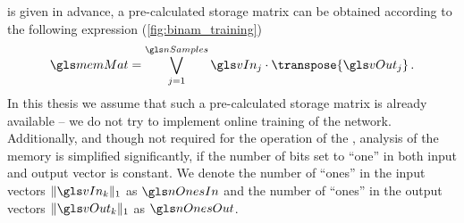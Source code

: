 is given in advance, a pre-calculated storage matrix \memMat can be obtained according to the following expression (\cref{fig:binam_training})
\begin{align}
	\memMat = \bigvee_{j = 1}^{\nSamples} \vIn_j \cdot \transpose{\vOut_j}\,.
	\label{eqn:binam_training}
\end{align}
In this thesis we assume that such a pre-calculated storage matrix \memMat is already available --  we do not try to implement online training of the network. Additionally, and though not required for the operation of the \BiNAM, analysis of the memory is simplified significantly, if the number of bits set to \enquote{one} in both input and output vector is constant. We denote the number of \enquote{ones} in the input vectors \(\|\vIn_k\|_1\) as \(\nOnesIn\) and the number of \enquote{ones} in the output vectors \(\|\vOut_k\|_1\) as \(\nOnesOut\).

